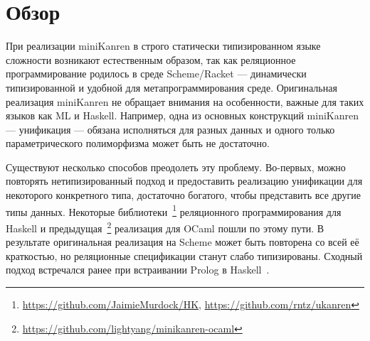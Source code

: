 
\section{Обзор}
\label{sec:relworks}

При реализации miniKanren в строго статически типизированном языке сложности возникают естественным образом, так как реляционное программирование родилось в среде Scheme/Racket --- динамически типизированной и удобной для метапрограммирования среде.
Оригинальная реализация miniKanren не обращает внимания на особенности, важные для таких языков как ML и Haskell.
Например, одна из основных конструкций miniKanren --- унификация --- обязана исполняться для разных данных и одного только параметрического полиморфизма может быть не достаточно.


Существуют несколько способов преодолеть эту проблему.
Во-первых, можно повторять нетипизированный подход и предоставить реализацию унификации для некоторого конкретного типа, достаточно богатого, чтобы представить все другие типы данных.
Некоторые библиотеки~\footnote{\url{https://github.com/JaimieMurdock/HK}, \url{https://github.com/rntz/ukanren}} реляционного программирования для Haskell и предыдущая~\footnote{\url{https://github.com/lightyang/minikanren-ocaml}} реализация для OCaml  пошли по этому пути.
В результате оригинальная реализация на Scheme может быть повторена со всей её краткостью, но реляционные спецификации  станут слабо типизированы.
Сходный подход встречался ранее при встраивании Prolog в  Haskell~\cite{PrologInHaskell}.


